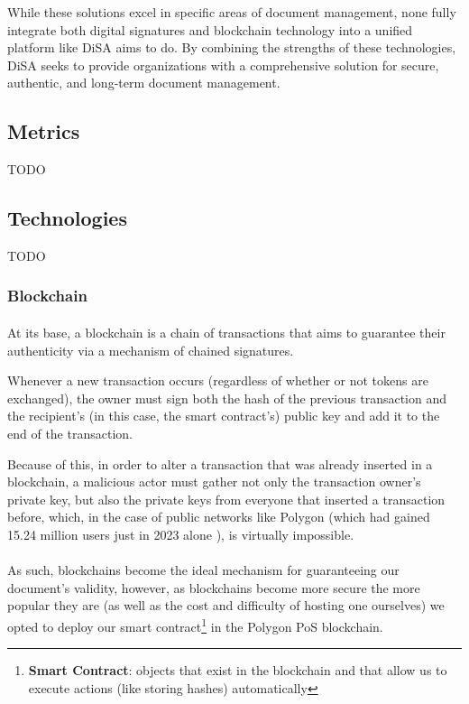 \documentclass[a4paper,11pt]{article}
\begin{document}
    \vspace{0.5cm}
    While these solutions excel in specific areas of document management, none fully integrate both digital signatures and blockchain technology into a unified platform like DiSA aims to do. By combining the strengths of these technologies, DiSA seeks to provide organizations with a comprehensive solution for secure, authentic, and long-term document management.

    \vspace{0.5cm}
    \subsection{Metrics}
        TODO
        
    \vspace{0.5cm}
    \subsection{Technologies}
        TODO
        
    \subsubsection{Blockchain}
        \paragraph{} At its base, a blockchain is a chain of transactions that aims to guarantee their authenticity via a mechanism of chained signatures.
        
        Whenever a new transaction occurs (regardless of whether or not tokens are exchanged), the owner must sign both the hash of the previous transaction and the recipient's (in this case, the smart contract's) public key and add it to the end of the transaction. \cite{bitcoin}
        
        Because of this, in order to alter a transaction that was already inserted in a blockchain, a malicious actor must gather not only the transaction owner's private key, but also the private keys from everyone that inserted a transaction before, which, in the case of public networks like Polygon (which had gained 15.24 million users just in 2023 alone \cite{polygonUserCount}), is virtually impossible.
    
        \paragraph{} As such, blockchains become the ideal mechanism for guaranteeing our document's validity, however, as blockchains become more secure the more popular they are (as well as the cost and difficulty of hosting one ourselves) we opted to deploy our smart contract\footnote{\textbf{Smart Contract}: objects that exist in the blockchain and that allow us to execute actions (like storing hashes) automatically} in the Polygon PoS blockchain. 
        
\end{document}
